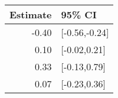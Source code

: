 \begin{tabular}{rl}
  \hline
Estimate & 95\% CI \\ 
  \hline
-0.40 & [-0.56,-0.24] \\ 
  0.10 & [-0.02,0.21] \\ 
  0.33 & [-0.13,0.79] \\ 
  0.07 & [-0.23,0.36] \\ 
   \hline
\end{tabular}


